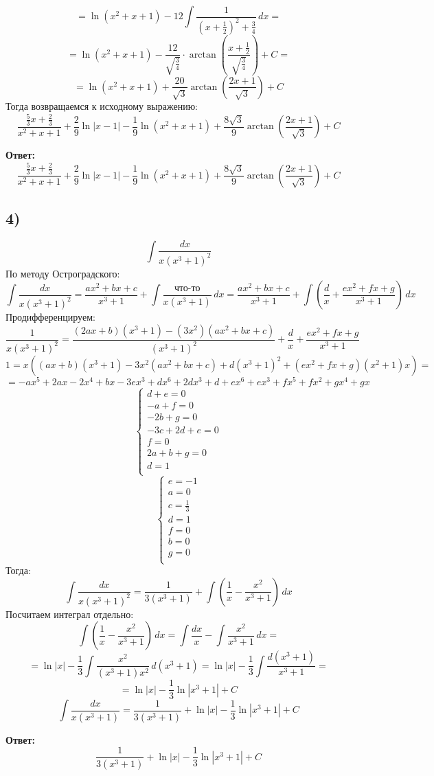 \documentclass[a4paper,12pt]{article}
\begin{document}
\[
=
\ln (x^2 + x + 1) - 12 \int \frac{1}{(x + \frac{1}{2})^2 + \frac{3}{4}} \, dx = 
\]
\[
= \ln (x^2 + x + 1) - \frac{12}{\sqrt{\frac{3}{4}}} \cdot \arctan \left( \frac{x+ \frac{1}{2}}{\sqrt{\frac{3}{4}}}\right) + C = 
\]
\[
= 
\ln (x^2 + x + 1) + \frac{20}{\sqrt{3}} \arctan \left( \frac{2x+1}{\sqrt{3}}\right) + C\]
Тогда возвращаемся к исходному выражению:
\[
 \frac{\frac{5}{3}x+\frac{2}{3}}{x^2+x+1} +  \frac{2}{9} \ln|x-1| - \frac{1}{9} \ln (x^2 + x + 1) + \frac{8 \sqrt{3}}{9} \arctan \left( \frac{2x+1}{\sqrt{3}}\right) + C
\]
\begin{center}
\textbf{Ответ: } 
\[
 \frac{\frac{5}{3}x+\frac{2}{3}}{x^2+x+1} +  \frac{2}{9} \ln|x-1| - \frac{1}{9} \ln (x^2 + x + 1) +\frac{ 8 \sqrt{3}}{9} \arctan \left( \frac{2x+1}{\sqrt{3}}\right) + C
\]
\end{center}
\subsection*{4)}
\[
\int \frac{dx}{x(x^3+1)^2}
\]
По методу Остроградского:
\[
\int \frac{dx}{x(x^3+1)^2} = \frac{ax^2 +bx + c}{x^3 + 1} + \int \frac{\text{что-то}}{x(x^3+1)} \,dx = \frac{ax^2 + bx + c}{x^3 +1} + \int \left( \frac{d}{x} + \frac{ex^2 + fx + g}{x^3 + 1}\right) \, dx 
\]
Продифференцируем:
\[
\frac{1}{x(x^3 + 1)^2} = \frac{(2ax + b)(x^3 +1) - (3x^2)(ax^2 + bx +c)}{(x^3 + 1)^2} + \frac{d}{x} + \frac{ex^2 +fx +g}{x^3 + 1} 
\]
\[
1 = x((ax+b)(x^3+1) - 3x^2(ax^2+bx+c) + d(x^3+1)^2 + (ex^2+fx+g)(x^2+1)x) = 
\]
\[
= -ax^5 + 2ax - 2x^4 + bx - 3ex^3 + dx^6 + 2dx^3 + d + ex^6 + ex^3 + fx^5 + fx^2 + gx^4+ gx
\]
\[
\begin{cases}
d + e = 0 \\
-a + f = 0 \\
-2b + g = 0 \\
-3c + 2d + e = 0 \\
f = 0\\
2a + b + g = 0 \\
d = 1\\
\end{cases}
\]
\[
\begin{cases}
e = -1 \\
 a = 0 \\
c = \frac{1}{3}  \\
d = 1\\
f = 0 \\
b = 0 \\
 g = 0 \\
\end{cases}
\]
Тогда:
\[
\int \frac{dx}{x(x^3 + 1)^2} = \frac{1}{3(x^3 + 1)} + \int \left(\frac{1}{x} - \frac{x^2}{x^3 + 1}\right) \, dx
\]
Посчитаем интеграл отдельно:
\[
\int \left( \frac{1}{x} - \frac{x^2}{x^3 + 1}\right) \, dx = \int \frac{dx}{x} - \int \frac{x^2}{x^3 + 1} \, dx = 
\]
\[
= \ln |x| - \frac{1}{3} \int \frac{x^2}{(x^3+1)x^2} \, d(x^3 + 1) = \ln |x| - \frac{1}{3} \int \frac{d(x^3 + 1)}{x^3 + 1} = 
\]
\[
= \ln |x| - \frac{1}{3} \ln |x^3 + 1| + C
\]
\[
\int \frac{dx}{x(x^3+1)} =  \frac{1}{3(x^3 + 1)} + \ln |x| - \frac{1}{3} \ln |x^3 + 1| + C
\]
\begin{center}
\textbf{Ответ: } 
\[
 \frac{1}{3(x^3 + 1)} + \ln |x| - \frac{1}{3} \ln |x^3 + 1| + C
\]
\end{center}
\end{document}
